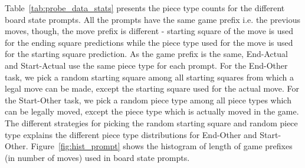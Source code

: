 Table~\ref{tab:probe_data_stats} presents the piece type counts for the different board state prompts. All the prompts have the same game prefix i.e. the previous moves, though, the move prefix is different - starting square of the move is used for the ending square predictions while the piece type used for the move is used for the starting square prediction. As the game prefix is the same, End-Actual and Start-Actual use the same piece type for each prompt. 
For the End-Other task, we pick a random starting square among all starting squares from which a legal move can be made, except the starting square used for the actual move.
For the Start-Other task, we pick a random piece type among all piece types which can be legally moved, except the piece type which is actually moved in the game.
The different strategies for picking the random starting square and random piece type explains the different piece type distributions for End-Other and Start-Other. Figure~\ref{fig:hist_prompt} shows the histogram of length of game prefixes (in number of moves) used in board state prompts.

  




